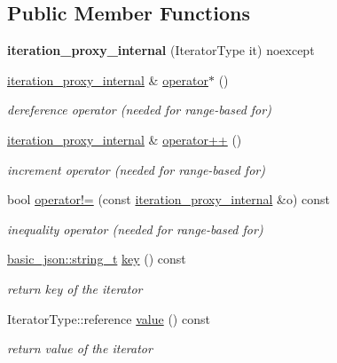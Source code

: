 \subsection*{Public Member Functions}
\begin{DoxyCompactItemize}
\item 
\hypertarget{classnlohmann_1_1basic__json_1_1iteration__proxy_1_1iteration__proxy__internal_a605a36195cc80dc71f2f3c396f516491}{}{\bfseries iteration\+\_\+proxy\+\_\+internal} (Iterator\+Type it) noexcept\label{classnlohmann_1_1basic__json_1_1iteration__proxy_1_1iteration__proxy__internal_a605a36195cc80dc71f2f3c396f516491}

\item 
\hyperlink{classnlohmann_1_1basic__json_1_1iteration__proxy_1_1iteration__proxy__internal}{iteration\+\_\+proxy\+\_\+internal} \& \hyperlink{classnlohmann_1_1basic__json_1_1iteration__proxy_1_1iteration__proxy__internal_a4a63c02623695c749b69eedcb383894c}{operator$\ast$} ()
\begin{DoxyCompactList}\small\item\em dereference operator (needed for range-\/based for) \end{DoxyCompactList}\item 
\hyperlink{classnlohmann_1_1basic__json_1_1iteration__proxy_1_1iteration__proxy__internal}{iteration\+\_\+proxy\+\_\+internal} \& \hyperlink{classnlohmann_1_1basic__json_1_1iteration__proxy_1_1iteration__proxy__internal_ae26cfcef30a6b393a745f7f0ad42d202}{operator++} ()
\begin{DoxyCompactList}\small\item\em increment operator (needed for range-\/based for) \end{DoxyCompactList}\item 
bool \hyperlink{classnlohmann_1_1basic__json_1_1iteration__proxy_1_1iteration__proxy__internal_aef16c850ae87460e3856fb29a2ef57f2}{operator!=} (const \hyperlink{classnlohmann_1_1basic__json_1_1iteration__proxy_1_1iteration__proxy__internal}{iteration\+\_\+proxy\+\_\+internal} \&o) const 
\begin{DoxyCompactList}\small\item\em inequality operator (needed for range-\/based for) \end{DoxyCompactList}\item 
\hyperlink{classnlohmann_1_1basic__json_ab63e618bbb0371042b1bec17f5891f42}{basic\+\_\+json\+::string\+\_\+t} \hyperlink{classnlohmann_1_1basic__json_1_1iteration__proxy_1_1iteration__proxy__internal_a044a84f7b783f28e5641b015466e42d3}{key} () const 
\begin{DoxyCompactList}\small\item\em return key of the iterator \end{DoxyCompactList}\item 
Iterator\+Type\+::reference \hyperlink{classnlohmann_1_1basic__json_1_1iteration__proxy_1_1iteration__proxy__internal_a6ae2b9c5e87c78506f570fd147cb11b5}{value} () const 
\begin{DoxyCompactList}\small\item\em return value of the iterator \end{DoxyCompactList}\end{DoxyCompactItemize}
